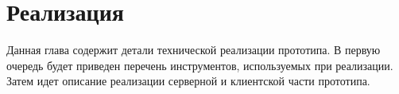 ﻿\section{Реализация}
\label{sections:Implementation}

Данная глава содержит  детали технической реализации прототипа.
В первую очередь будет приведен перечень инструментов,
используемых при реализации.
Затем идет описание реализации серверной и клиентской части прототипа.





